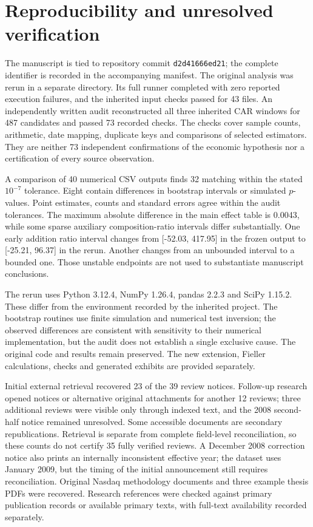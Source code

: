 \section{Reproducibility and unresolved verification}
\label{app:audit}

The manuscript is tied to repository commit \texttt{d2d41666ed21}; the complete identifier is recorded in the accompanying manifest. The original analysis was rerun in a separate directory. Its full runner completed with zero reported execution failures, and the inherited input checks passed for 43 files. An independently written audit reconstructed all three inherited CAR windows for 487 candidates and passed 73 recorded checks. The checks cover sample counts, arithmetic, date mapping, duplicate keys and comparisons of selected estimators. They are neither 73 independent confirmations of the economic hypothesis nor a certification of every source observation.

A comparison of 40 numerical CSV outputs finds 32 matching within the stated $10^{-7}$ tolerance. Eight contain differences in bootstrap intervals or simulated $p$-values. Point estimates, counts and standard errors agree within the audit tolerances. The maximum absolute difference in the main effect table is 0.0043, while some sparse auxiliary composition-ratio intervals differ substantially. One early addition ratio interval changes from [-52.03, 417.95] in the frozen output to [-25.21, 96.37] in the rerun. Another changes from an unbounded interval to a bounded one. Those unstable endpoints are not used to substantiate manuscript conclusions.

The rerun uses Python 3.12.4, NumPy 1.26.4, pandas 2.2.3 and SciPy 1.15.2. These differ from the environment recorded by the inherited project. The bootstrap routines use finite simulation and numerical test inversion; the observed differences are consistent with sensitivity to their numerical implementation, but the audit does not establish a single exclusive cause. The original code and results remain preserved. The new extension, Fieller calculations, checks and generated exhibits are provided separately.

Initial external retrieval recovered 23 of the 39 review notices. Follow-up research opened notices or alternative original attachments for another 12 reviews; three additional reviews were visible only through indexed text, and the 2008 second-half notice remained unresolved. Some accessible documents are secondary republications. Retrieval is separate from complete field-level reconciliation, so these counts do not certify 35 fully verified reviews. A December 2008 correction notice also prints an internally inconsistent effective year; the dataset uses January 2009, but the timing of the initial announcement still requires reconciliation. Original Nasdaq methodology documents and three example thesis PDFs were recovered. Research references were checked against primary publication records or available primary texts, with full-text availability recorded separately.

